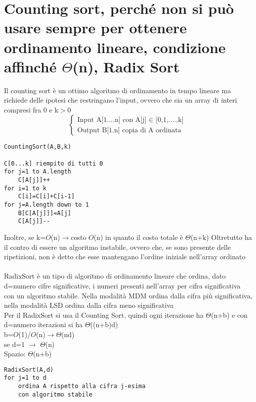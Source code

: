 \documentclass[12pt,oneside,a4paper]{article}
\newcommand\Omicron{O}
\begin{document}
\section{Counting sort, perché non si può usare sempre per ottenere ordinamento lineare, condizione affinché $ \Theta$(n), Radix Sort}
Il counting sort è un ottimo algoritmo di ordinamento in tempo lineare ma richiede delle ipotesi che restringano l'input, ovvero che sia un array di interi compresi fra 0 e k$>$0\\
\[
\begin{cases}
	\text{Input A[1....n] con A[j] $\in$ [0,1,....,k] }\\
	\text{Output B[1.n] copia di A ordinata }
\end{cases}
\]
\begin{lstlisting}[style=pseudocodice]
CountingSort(A,B,k)

C[0...k] riempito di tutti 0
for j=1 to A.length
	C[A[j]]++
for i=1 to k
	C[i]=C[i]+C[i-1]
for j=A.length down to 1
	B[C[A[j]]]=A[j]
	C[A[j]]--
\end{lstlisting}
Inoltre, se k=$\Omicron$(n)$\to$costo $\Omicron$(n) in quanto il costo totale è $\Theta$(n+k)
Oltretutto ha il contro di essere un algoritmo instabile, ovvero che, se sono presente delle ripetizioni, non è detto che esse mantengano l'ordine iniziale nell'array ordinato\\\\
RadixSort è un tipo di algoritmo di ordinamento lineare che ordina, dato d=numero cifre significative, i numeri presenti nell'array per cifra significativa con un algoritmo stabile. Nella modalità MDM ordina dalla cifra più significativa, nella modalità LSD ordina dalla cifra meno significativa\\
Per il RadixSort si usa il Counting Sort, quindi ogni iterazione ha $\Theta$(n+b) e con d=numero iterazioni si ha $\Theta$((n+b)d)\\
b=$\Omicron$(1)/$\Omicron$(n)$\to$$\Theta$(nd)\\
se d=1 $\to$ $\Theta$(n)\\
Spazio: $\Theta$(n+b)
\begin{lstlisting}[style=pseudocodice]
RadixSort(A,d)
for j=1 to d
	ordina A rispetto alla cifra j-esima
	con algoritmo stabile
\end{lstlisting}
\end{document}
